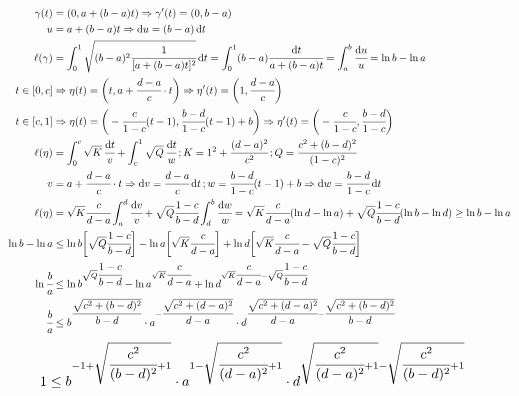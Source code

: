\documentclass[10pt,a4paper]{article}
\begin{document}
		\begin{align*}
		  \gamma(t) &= (0, a + (b - a)t) \Rightarrow \gamma'(t) = (0, b - a) \\
		  u &= a + (b - a)t \Rightarrow \mathrm{d}u = (b - a) \,\mathrm{d}t \\
		  \ell(\gamma) &= \int_0^1 \sqrt{ (b - a)^2 \cfrac{1}{[a + (b - a)t]^2}} \,\textrm{d}t = \int_0^1 (b - a) \cfrac{\textrm{d}t}{a + (b - a)t} = \int_a^b \cfrac{\mathrm{d}u}{u} = \ln b - \ln a \\
		  t \in [0, c] &\Rightarrow \eta(t) = \bigg(t, a + \cfrac{d-a}{c} \cdot t\bigg) \Rightarrow \eta'(t) = \bigg(1, \cfrac{d-a}{c}\bigg) \\
		  t \in [c, 1] &\Rightarrow \eta(t) = \bigg(- \cfrac{c}{1-c} (t - 1), \cfrac{b-d}{1-c} (t-1) + b\bigg) \Rightarrow \eta'(t) = \bigg(-\cfrac{c}{1-c}, \cfrac{b-d}{1-c}\bigg) \\
		  \ell(\eta) &= \int_0^c \sqrt{K} \, \cfrac{\mathrm{d}t}{v} + \int_c^1 \sqrt{Q} \, \cfrac{\mathrm{d}t}{w} \,; K = 1^2 + \cfrac{(d-a)^2}{c^2} \,; Q = \cfrac{c^2 + (b - d)^2}{(1-c)^2} \\
		  v &= a + \cfrac{d-a}{c} \cdot t \Rightarrow \mathrm{d}v = \cfrac{d-a}{c} \, \mathrm{d}t \,; w = \cfrac{b-d}{1-c} (t-1) + b \Rightarrow \mathrm{d}w = \cfrac{b-d}{1-c} \, \mathrm{d}t \\
		  \ell(\eta) &= \sqrt{K} \cfrac{c}{d - a} \int_a^d \cfrac{\mathrm{d}v}{v} + \sqrt{Q} \cfrac{1-c}{b-d} \int_d^b \cfrac{\mathrm{d}w}{w} = \sqrt{K} \cfrac{c}{d - a} (\ln d - \ln a) + \sqrt{Q} \cfrac{1-c}{b-d} (\ln b - \ln d) \ge \ln b - \ln a \\
		  \ln b - \ln a &\le \ln b \bigg[ \sqrt{Q} \cfrac{1-c}{b-d} \bigg] - \ln a \bigg[ \sqrt{K} \cfrac{c}{d - a} \bigg] + \ln d \bigg[ \sqrt{K} \cfrac{c}{d - a} - \sqrt{Q} \cfrac{1-c}{b-d} \bigg] \\
		  \ln \cfrac{b}{a} &\le \ln b^{\sqrt{Q} \cfrac{1-c}{b-d}} - \ln a^{\sqrt{K} \cfrac{c}{d - a}} + \ln d^{\sqrt{K} \cfrac{c}{d - a} - \sqrt{Q} \cfrac{1-c}{b-d}} \\
		  \cfrac{b}{a} &\le b^{\cfrac{\sqrt{c^2 + (b - d)^2}}{b-d}} \cdot a^{-\cfrac{\sqrt{c^2 + (d-a)^2}}{d - a}} \cdot d^{\cfrac{\sqrt{c^2 + (d-a)^2}}{d - a} - \cfrac{\sqrt{c^2 + (b - d)^2}}{b-d}} \\
		\end{align*}
		\begin{align}
		  1 &\le b^{-1 + \sqrt{\cfrac{c^2}{(b-d)^2} + 1}} \cdot a^{1-\sqrt{\cfrac{c^2}{(d - a)^2} + 1}} \cdot d^{\sqrt{\cfrac{c^2}{(d - a)^2} + 1} - \sqrt{\cfrac{c^2}{(b-d)^2} + 1}} \label{desig_louca}
		\end{align}
\end{document}
